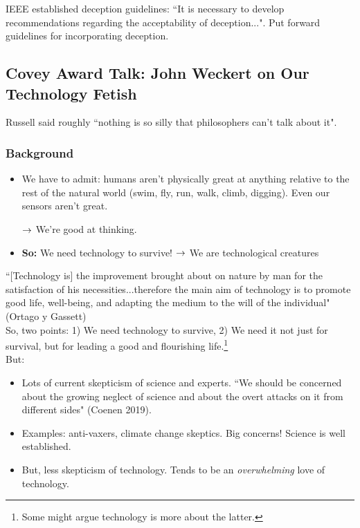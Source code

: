 IEEE established deception guidelines: ``It is necessary to develop recommendations regarding the acceptability of deception...". Put forward guidelines for incorporating deception.

\spacerule

\subsection{Covey Award Talk: John Weckert on Our Technology Fetish}


Russell said roughly ``nothing is so silly that philosophers can't talk about it". \\

\subsubsection{Background}

\begin{itemize}
\item We have to admit: humans aren't physically great at anything relative to the rest of the natural world (swim, fly, run, walk, climb, digging). Even our sensors aren't great.

$\rightarrow$ We're good at thinking.

\item {\bf So:} We need technology to survive!
$\rightarrow$ We are technological creatures
\end{itemize}

``[Technology is] the improvement brought about on nature by man for the satisfaction of his necessities...therefore the main aim of technology is to promote good life, well-being, and adapting the medium to the will of the individual" (Ortago y Gassett) \\

So, two points: 1) We need technology to survive, 2) We need it not just for survival, but for leading a good and flourishing life.\footnote{Some might argue technology is more about the latter.} \\

But:
\begin{itemize}
	\item Lots of current skepticism of science and experts.
	``We should be concerned about the growing neglect of science and about the overt attacks on it from different sides" (Coenen 2019).

	\item Examples: anti-vaxers, climate change skeptics. Big concerns! Science is well established.

	\item But, less skepticism of technology. Tends to be an {\it overwhelming} love of technology.
\end{itemize}

